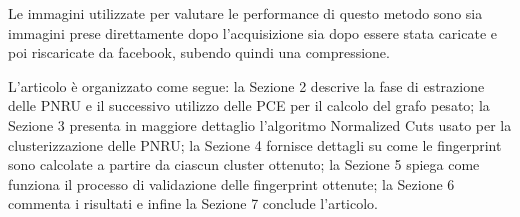 Le immagini utilizzate per valutare le performance di questo metodo sono sia immagini prese direttamente dopo l'acquisizione sia dopo essere stata caricate e poi riscaricate da facebook, subendo quindi una compressione.

L'articolo è organizzato come segue: la Sezione 2 descrive la fase di estrazione delle PNRU e il successivo utilizzo delle PCE per il calcolo del grafo pesato; la Sezione 3 presenta in maggiore dettaglio l'algoritmo Normalized Cuts usato per la clusterizzazione delle PNRU; la Sezione 4 fornisce dettagli su come le fingerprint sono calcolate a partire da ciascun cluster ottenuto; la Sezione 5 spiega come funziona il processo di validazione delle fingerprint ottenute; la Sezione 6 commenta i risultati e infine la Sezione 7 conclude l'articolo.
